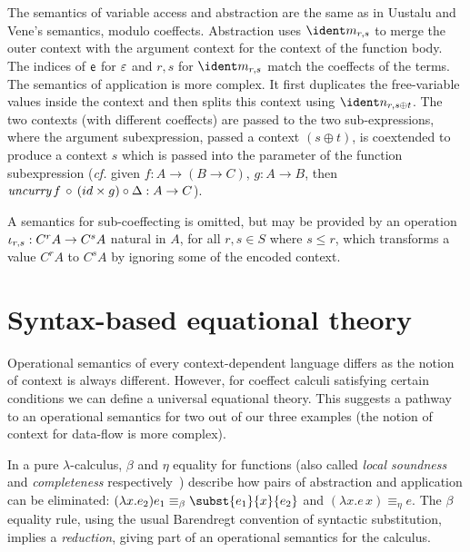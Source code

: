The semantics of variable access and abstraction are the same as in
Uustalu and Vene's semantics, modulo coeffects. Abstraction uses $\cmerge_{r, s}$ to merge the outer
context with the argument context for the context of the function body.
The indices of $\mathsf{e}$ for
$\varepsilon$ and $r,s$ for $\cmerge_{r, s}$ match the coeffects
of the terms.
The semantics of application is more complex. It first duplicates the
free-variable values inside the context and then splits this context
using $\csplit_{r, {s \oplus t}}$. The two contexts (with
different coeffects) are passed to the two sub-expressions,
where the argument subexpression, passed a context $(s \oplus t)$,
is coextended to produce a context $s$ which is passed into
the parameter of the function subexpression (\emph{cf.} given $f : A \rightarrow (B \rightarrow C)$,
 $g : A \rightarrow B$, then $\emph{uncurry} \, f \, \circ \, (id \times g) \circ \Delta : A \rightarrow C$).

A semantics for sub-coeffecting is omitted, but may be provided
by an operation 
$\iota_{r, s} : C^{r} A \rightarrow C^{s} A$ natural in $A$, for all $r, s \in S$ where $s \leq r$,
which transforms a value $C^r A$ to $C^s A$ by
ignoring some of the encoded context.


\section{Syntax-based equational theory}
\label{sec:syntactic}

Operational semantics of every context-dependent language differs as the notion of context 
is always different. However, for coeffect calculi satisfying certain conditions we can 
define a universal equational theory. This suggests a pathway to an operational semantics for 
two out of our three examples (the notion of context for data-flow is more complex).

In a pure $\lambda$-calculus, $\beta$ and $\eta$ equality for
functions (also called \emph{local soundness} and \emph{completeness}
respectively~\cite{logic-modal-reconstruction})
describe how pairs of abstraction and application can be eliminated:
$(\lambda x . e_2) e_1 \equiv_\beta \subst{e_1}{x}{e_2}$ and $(\lambda x . e \, x) 
\equiv_\eta e$. The $\beta$ equality rule, using the usual Barendregt convention of 
syntactic substitution, implies a \emph{reduction},
giving part of an operational semantics for the calculus.

